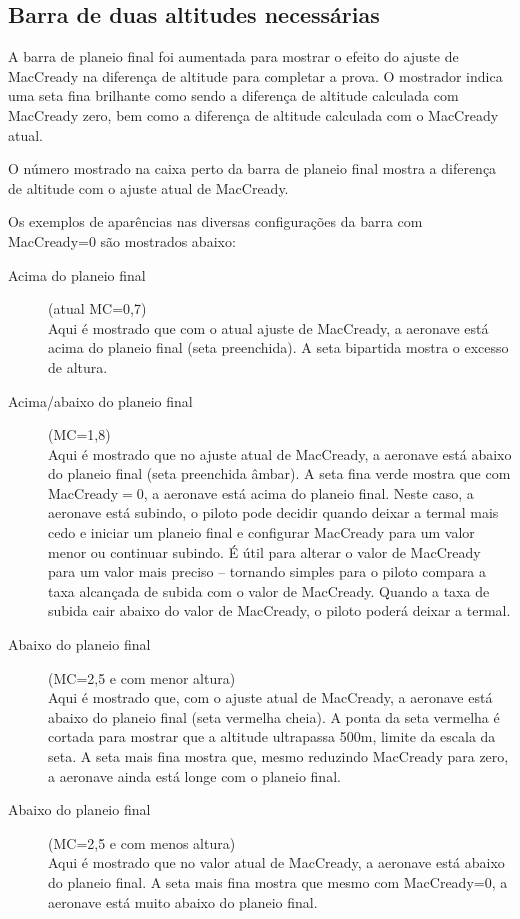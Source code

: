 \subsection*{Barra de duas altitudes necessárias}

A barra de planeio final foi aumentada para mostrar o efeito do ajuste de MacCready na diferença de altitude para completar a prova.  O mostrador indica uma seta fina brilhante como sendo a diferença de altitude calculada com MacCready zero, bem como a diferença de altitude calculada com o MacCready atual.  

O número mostrado na caixa perto da barra de planeio final mostra a diferença de altitude com o ajuste atual de MacCready.

Os exemplos de aparências nas diversas configurações da barra com MacCready=0 são mostrados abaixo:

\begin{description}
\item[Acima do planeio final] (atual MC=0,7) \\
  Aqui é mostrado que com o atual ajuste de MacCready, a aeronave está acima do planeio final (seta preenchida).  A seta bipartida mostra o excesso de altura.

\item[Acima/abaixo do planeio final] (MC=1,8) \\
  Aqui é mostrado que no ajuste atual de MacCready, a aeronave está abaixo do planeio final (seta preenchida âmbar).  A seta fina verde mostra que com MacCready$=0$, a aeronave está acima do planeio final. 
 Neste caso, a aeronave está subindo, o piloto pode decidir quando deixar a termal mais cedo e iniciar um planeio final e configurar MacCready para um valor menor ou continuar subindo.
   É útil para alterar o valor de MacCready para um valor mais preciso – tornando simples para o piloto compara a taxa alcançada de subida com o valor de MacCready.  Quando a taxa de subida cair abaixo do valor de MacCready, o piloto poderá deixar a termal.
 
\item[Abaixo do planeio final] (MC=2,5 e com menor altura) \\
  Aqui é mostrado que, com o ajuste atual de MacCready, a aeronave está abaixo do planeio final (seta vermelha cheia).  A ponta da seta vermelha é cortada para mostrar que a altitude ultrapassa 500m, limite da escala da seta.
  A seta mais fina mostra que, mesmo reduzindo MacCready para zero, a aeronave ainda está longe com o planeio final.

\item[Abaixo do planeio final] (MC=2,5 e com menos altura) \\
  Aqui é mostrado que no valor atual de MacCready, a aeronave está abaixo do planeio final.  A seta mais fina
  mostra que mesmo com MacCready=0, a aeronave está muito abaixo do planeio final.
\end{description}


